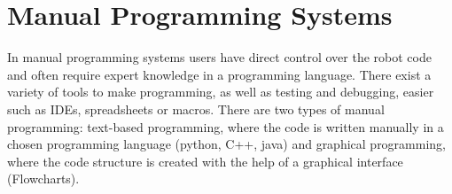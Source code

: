 

\section{Manual Programming Systems}\label{subsec:Manual Programming Systems}
In manual programming systems users have direct control over the robot code
and often require expert knowledge in a programming language. %
There exist a variety of tools to make programming, as well as testing and debugging, easier such as IDEs, spreadsheets or macros. 
There are two types of manual programming: text-based programming, where the code is written manually in a chosen programming language (\eg python, C++, java) and graphical programming, where the code structure is created with the help of a graphical interface (\eg Flowcharts). 


